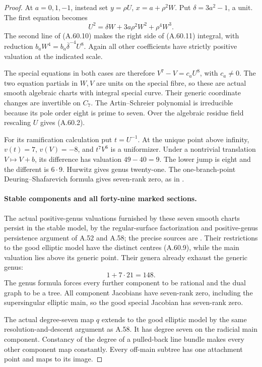 \begin{proof}
At \(a=0,1,-1\), instead set \(y=\rho U\),
\(x=a+\rho^2W\). Put \(\delta=3a^2-1\), a unit.
The first equation becomes
\[
                U^2=\delta W+3a\rho^2W^2+\rho^4W^3.
                                                        \tag{A.60.13}
\]
The second line of (A.60.10) makes the right side
of (A.60.11) integral, with reduction
\(b_aW^4=b_a\overline\delta^{-4}U^8\).
Again all other coefficients have strictly positive
valuation at the indicated scale.

The special equations in both cases are therefore
\(V^7-V=c_aU^8\), with \(c_a\ne0\). The two
equation partials in \(W,V\) are units on the
special fibre, so these are actual smooth algebraic
charts with integral special curve. Their generic
coordinate changes are invertible on \(C_7\).
The Artin--Schreier polynomial is irreducible because
its pole order eight is prime to seven. Over the
algebraic residue field rescaling \(U\) gives
(A.60.2).

For its ramification calculation put \(t=U^{-1}\).
At the unique point above infinity, \(v(t)=7\),
\(v(V)=-8\), and \(t^7V^6\) is a uniformizer.
Under a nontrivial translation \(V\mapsto V+b\),
its difference has valuation \(49-40=9\). The
lower jump is eight and the different is \(6\cdot9\).
Hurwitz gives genus twenty-one. The one-branch-point
Deuring--Shafarevich formula gives seven-rank zero,
as in \cite[Corollary 1.8]{fghCrew1984}.

\paragraph{Stable components and all forty-nine marked sections.}
The actual positive-genus valuations furnished by
these seven smooth charts persist in the stable
model, by the regular-surface factorization and
positive-genus persistence argument of A.52 and
A.58; the precise sources are
\cite[Theorem 9.2.2, Remark 9.2.6 and Theorem 9.3.21]
{fghLiu}. Their restrictions to the good elliptic
model have the distinct centres (A.60.9), while
the main valuation lies above its generic point.
Their genera already exhaust the generic genus:
\[
                              1+7\cdot21=148.          \tag{A.60.14}
\]
The genus formula forces every further component
to be rational and the dual graph to be a tree.
All component Jacobians have seven-rank zero,
including the supersingular elliptic main, so
the good special Jacobian has seven-rank zero.

The actual degree-seven map \(q\) extends to the
good elliptic model by the same resolution-and-descent
argument as A.58. It has degree seven on the
radicial main component. Constancy of the degree
of a pulled-back line bundle makes every other
component map constantly. Every off-main subtree
has one attachment point and maps to its image.


\end{proof}

